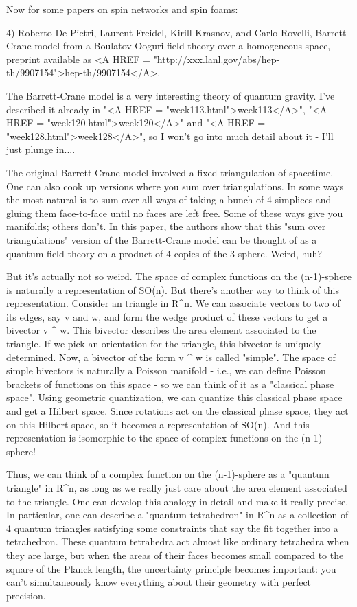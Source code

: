 Now for some papers on spin networks and spin foams:

4) Roberto De Pietri, Laurent Freidel, Kirill Krasnov, and Carlo Rovelli, 
Barrett-Crane model from a Boulatov-Ooguri field theory over a 
homogeneous space, preprint available as <A HREF = "http://xxx.lanl.gov/abs/hep-th/9907154">hep-th/9907154</A>.  

The Barrett-Crane model is a very interesting theory of quantum gravity.
I've described it already in "<A HREF =
"week113.html">week113</A>", "<A HREF =
"week120.html">week120</A>" and "<A HREF =
"week128.html">week128</A>", so I won't go into much detail about
it - I'll just plunge in....

The original Barrett-Crane model involved a fixed triangulation of
spacetime.   One can also cook up versions where you sum over 
triangulations.  In some ways the most natural is to sum over all ways
of taking a bunch of 4-simplices and gluing them face-to-face until no
faces are left free.  Some of these ways give you manifolds; others
don't.  In this paper, the authors show that this "sum over
triangulations" version of the Barrett-Crane model can be thought of
as a quantum field theory on a product of 4 copies of the 3-sphere.
Weird, huh?

But it's actually not so weird.  The space of complex functions on the
(n-1)-sphere is naturally a representation of SO(n).  But there's
another way to think of this representation.  Consider an triangle in
R^{n}.  We can associate vectors to two of its edges, say v and w, and
form the wedge product of these vectors to get a bivector v ^ w.  This
bivector describes the area element associated to the triangle.  If we
pick an orientation for the triangle, this bivector is uniquely
determined.  Now, a bivector of the form v ^ w is called
"simple".  The space of simple bivectors is naturally a
Poisson manifold - i.e., we can define Poisson brackets of functions on
this space - so we can think of it as a "classical phase
space".  Using geometric quantization, we can quantize this
classical phase space and get a Hilbert space.  Since rotations act on
the classical phase space, they act on this Hilbert space, so it becomes
a representation of SO(n).  And this representation is isomorphic to the
space of complex functions on the (n-1)-sphere!

Thus, we can think of a complex function on the (n-1)-sphere as a
"quantum triangle" in R^{n}, as long as we really just
care about the area element associated to the triangle.  One can develop
this analogy in detail and make it really precise.  In particular, one
can describe a "quantum tetrahedron" in R^{n} as a
collection of 4 quantum triangles satisfying some constraints that say
the fit together into a tetrahedron.  These quantum tetrahedra act
almost like ordinary tetrahedra when they are large, but when the areas
of their faces becomes small compared to the square of the Planck
length, the uncertainty principle becomes important: you can't
simultaneously know everything about their geometry with perfect
precision.

